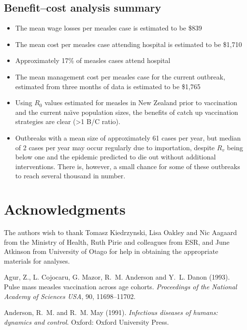 \documentclass{article}
\begin{document}
\begin{itemize}
\subsection{Benefit--cost analysis summary}
\begin{itemize}
\item The mean wage losses per measles case is estimated to be \$839
\item The mean cost per measles case attending hospital is estimated to be \$1,710
\item Approximately 17\% of measles cases attend hospital
\item The mean management cost per measles case for the current outbreak, estimated from three months of data is estimated to be \$1,765
\item Using $R_0$ values estimated for measles in New Zealand prior to vaccination and the current na\"{\i}ve population sizes, the benefits of catch up vaccination strategies are clear (>1 B/C ratio).
\item Outbreaks with a mean size of approximately 61 cases per year, but median of 2 cases per year may occur regularly due to importation, despite $R_v$ being below one and the epidemic predicted to die out without additional interventions. There is, however, a small chance for some of these outbreaks to reach several thousand in number.
\end{itemize}

\section{Acknowledgments}
The authors wish to thank Tomasz Kiedrzynski, Lisa Oakley and Nic Aagaard from the Ministry of Health, Ruth Pirie and colleagues from ESR, and June Atkinson from University of Otago for help in obtaining the appropriate materials for analyses.

\begin{thebibliography}{}


Agur, Z., L. Cojocaru, G. Mazor, R.~M. Anderson and Y.~L. Danon (1993).
\newblock Pulse mass measles vaccination across age cohorts.
\newblock \emph{Proceedings of the National Academy of Sciences USA}, 90, 11698--11702.

Anderson, R.~M. and R.~M. May (1991).
\newblock \emph{Infectious diseases of humans: dynamics and control}. Oxford: Oxford University Press.


\end{thebibliography}
\end{itemize}
\end{document}
